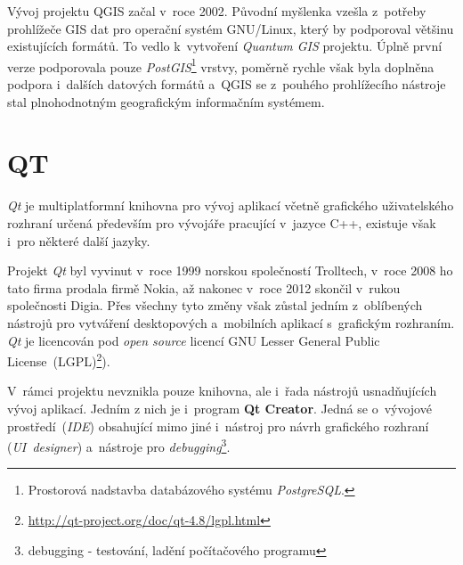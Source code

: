 Vývoj projektu QGIS začal v~roce 2002. Původní myšlenka vzešla z~potřeby 
prohlížeče GIS dat pro operační systém GNU/Linux, který by podporoval většinu 
existujících formátů. To vedlo k~vytvoření \textit{Quantum GIS} projektu. Úplně 
první verze podporovala pouze \textit{PostGIS}\footnote{Prostorová nadstavba 
databázového systému \textit{PostgreSQL}.} vrstvy, poměrně rychle však byla 
doplněna podpora i~dalších datových formátů a~QGIS se z~pouhého prohlížecího 
nástroje stal plnohodnotným geografickým informačním systémem.




\section{QT}
\label{qt}

\textit{Qt} je multiplatformní knihovna pro vývoj aplikací včetně grafického 
uživatelského rozhraní určená především pro vývojáře pracující v~jazyce C++,
existuje však i~pro některé další jazyky.

Projekt \textit{Qt} byl vyvinut v~roce 1999 norskou společností Trolltech, 
v~roce 2008 ho tato firma prodala firmě Nokia, až nakonec v~roce 2012 skončil 
v~rukou společnosti Digia. Přes všechny tyto změny však zůstal jedním z~oblíbených
nástrojů pro vytváření desktopových a~mobilních aplikací s~grafickým rozhraním.
\textit{Qt} je licencován pod \textit{open source} licencí GNU Lesser General 
Public License~(LGPL)\footnote{\url{http://qt-project.org/doc/qt-4.8/lgpl.html}}).

V~rámci projektu nevznikla pouze knihovna, ale i~řada nástrojů usnadňujících
vývoj aplikací. Jedním z nich je i~program \textbf{Qt Creator}. Jedná se o~vývojové 
prostředí~(\textit{IDE}) obsahující mimo jiné i~nástroj pro návrh grafického 
rozhraní (\textit{UI~designer}) a~nástroje pro \textit{debugging}\footnote{debugging
 - testování, ladění počítačového programu}.
